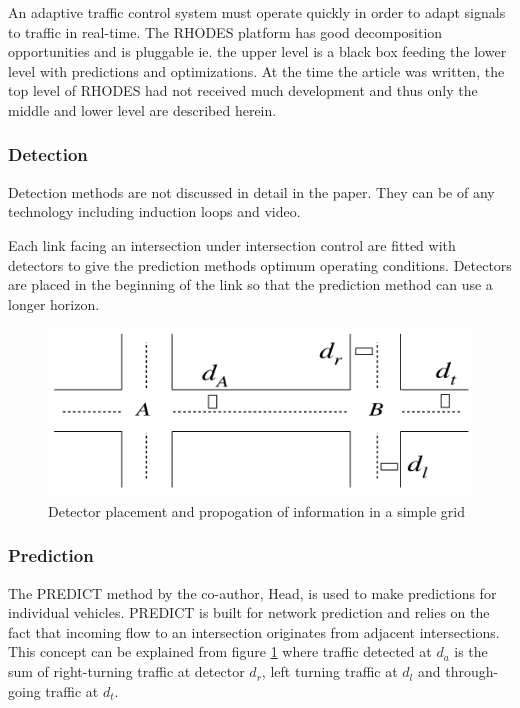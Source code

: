 An adaptive traffic control system must operate quickly in order to adapt signals to traffic in real-time. The RHODES platform has good decomposition opportunities and is pluggable ie. the upper level is a black box feeding the lower level with predictions and optimizations. At the time the article was written, the top level of RHODES had not received much development and thus only the middle and lower level are described herein.

\subsubsection*{Detection}
Detection methods are not discussed in detail in the paper. They can be of any technology including induction loops and video. 

Each link facing an intersection under intersection control are fitted with detectors to give the prediction methods optimum operating conditions. Detectors are placed in the beginning of the link so that the prediction method can use a longer horizon.

\begin{figure}[!ht]
\begin{center}
\includegraphics[scale=0.5]{rhodes_prediction-strategy.png} 
\end{center}
\caption{Detector placement and propogation of information in a simple grid}
\label{fig:rhodes_predict}
\end{figure}

\subsubsection*{Prediction}
The PREDICT method by the co-author, Head, is used to make predictions for individual vehicles. PREDICT is built for network prediction and relies on the fact that incoming flow to an intersection originates from adjacent intersections. This concept can be explained from figure \ref{fig:rhodes_predict} where traffic detected at $d_a$ is the sum of right-turning traffic at detector $d_r$, left turning traffic at $d_l$ and through-going traffic at $d_t$.

